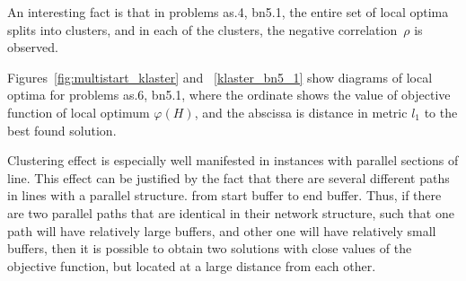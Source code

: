 \documentclass{ifacconf}
\begin{document}
An interesting fact is 
that in problems as.4, bn5.1, the entire set of local optima splits
into clusters, and in each of the clusters, the negative correlation~$\rho$ is observed.

Figures~\ref{fig:multistart_klaster} and ~\ref{klaster_bn5_1} show diagrams of local optima for problems
as.6, bn5.1, where the ordinate shows the value of objective function of local optimum $\varphi(H)$, and the abscissa is
distance in metric $l_1$ to the best found solution.

Clustering effect is especially well manifested in instances with parallel sections of line.
This effect can be justified by the  fact that there are several different paths in lines with a parallel structure.
from start buffer to end buffer. Thus, if there are two parallel paths that are identical in their network structure,
such that one path will have relatively large buffers, and other one will have relatively small buffers, then 
it is possible to obtain two solutions with close values of the objective function, but located at a large distance from each other.
\end{document}
